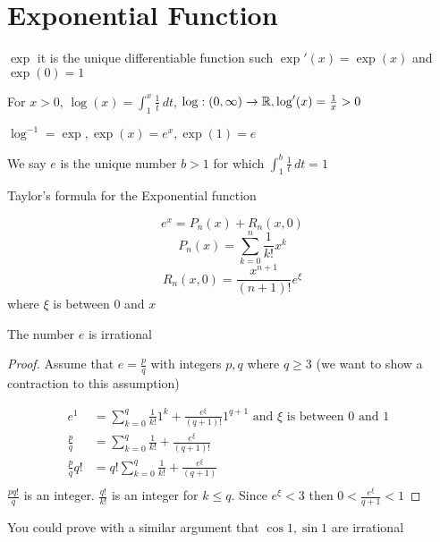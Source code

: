 \section{Exponential Function}

$\exp$ it is the unique differentiable function such $\exp'(x) = \exp(x)$ and $\exp(0) = 1$

For $x > 0$, $\displaystyle\log(x) = \int_1^x \frac{1}{t}\, dt$, $\log: (0, \infty) \to \mathbb R, \log'(x) = \frac{1}{x} > 0$

$\log^{-1} = \exp, \exp(x) = e^x, \exp(1) = e$

We say $e$ is the unique number $b > 1$ for which $\displaystyle\int_1^b \frac{1}{t}\, dt = 1$

Taylor's formula for the Exponential function

\[e^x = P_n(x) + R_n(x, 0)\]
\[P_n(x) = \sum_{k=0}^n \frac{1}{k!}x^k\]
\[R_n(x, 0) = \frac{x^{n+1}}{(n+1)!}e^{\xi}\]
where $\xi$ is between $0$ and $x$

\begin{theorem*}
  The number $e$ is irrational

\end{theorem*}
\begin{proof}
  Assume that $e = \frac{p}{q}$ with integers $p, q$ where $q \ge 3$
  (we want to show a contraction to this assumption)

  \begin{align*}
    e^1 &= \sum_{k=0}^{q} \frac{1}{k!}1^k + \frac{e^\xi}{(q+1)!}1^{q+1} \text{ and $\xi$ is between $0$ and $1$ }\\
    \frac{p}{q}&= \sum_{k=0}^{q} \frac{1}{k!} + \frac{e^\xi}{(q+1)!}\\
    \frac{p}{q}q! &= q!\sum_{k=0}^{q} \frac{1}{k!} + \frac{e^\xi}{(q+1)}\\
  \end{align*}
  $\frac{pq!}{q}$ is an integer.
  $\frac{q!}{k!}$ is an integer for $k \le q$.
  Since $e^\xi < 3$ then $0 < \frac{e^\xi}{q+1} < 1$
\end{proof}
You could prove with a similar argument that $\cos 1, \sin 1$ are irrational

